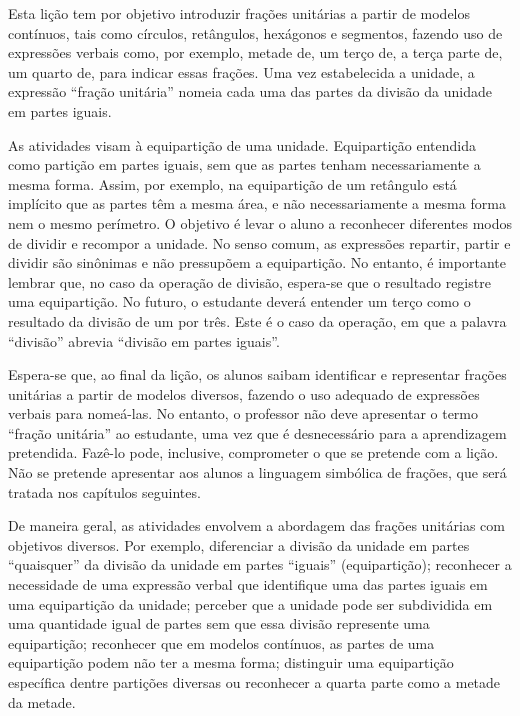 


\noindent {\color{special}{\Large \bf LIÇÃO 1 - Para o professor}}
\vspace{.5cm}

Esta lição tem por objetivo introduzir frações unitárias a partir de modelos contínuos, tais como círculos, retângulos, hexágonos e segmentos, fazendo uso de expressões verbais como, por exemplo, metade de, um terço de, a terça parte de, um quarto de, para indicar essas frações.
Uma vez estabelecida a unidade, a expressão ``fração unitária'' nomeia cada uma das partes da divisão da unidade em partes iguais.

As atividades visam à equipartição de uma unidade. Equipartição entendida como partição em partes iguais, sem que as partes tenham necessariamente a mesma forma. Assim, por exemplo, na equipartição de um retângulo está implícito que as partes têm a mesma área, e não necessariamente a mesma forma nem o mesmo perímetro. O objetivo é levar o aluno a reconhecer diferentes modos de dividir e recompor a unidade. No senso comum, as expressões repartir, partir e dividir são sinônimas e não pressupõem a equipartição. No entanto, é importante lembrar que, no caso da operação de divisão, espera-se que o resultado registre uma equipartição. No futuro, o estudante deverá entender um terço como o resultado da divisão de um por três. Este é o caso da operação, em que a palavra ``divisão'' abrevia ``divisão em partes iguais''.

Espera-se que, ao final da lição, os alunos saibam identificar e representar frações unitárias a partir de modelos  diversos, fazendo o uso adequado de expressões verbais para nomeá-las. No entanto, o professor não deve apresentar o termo ``fração unitária'' ao estudante, uma vez que é desnecessário para a aprendizagem pretendida. Fazê-lo pode, inclusive, comprometer o que se pretende com a lição. Não se pretende apresentar aos alunos a linguagem simbólica de frações, que será tratada nos capítulos seguintes.

De maneira geral, as atividades envolvem a abordagem das frações unitárias com objetivos diversos. Por exemplo, diferenciar a divisão da unidade em partes ``quaisquer'' da divisão da unidade em partes ``iguais'' (equipartição); reconhecer a necessidade de uma expressão verbal que identifique uma das partes iguais em uma equipartição da unidade; perceber que a unidade pode ser subdividida em uma quantidade igual de partes sem que essa divisão represente uma equipartição; reconhecer que em modelos contínuos, as partes de uma equipartição podem não ter a mesma forma; distinguir uma equipartição específica dentre partições diversas ou reconhecer a quarta parte como a metade da metade.

